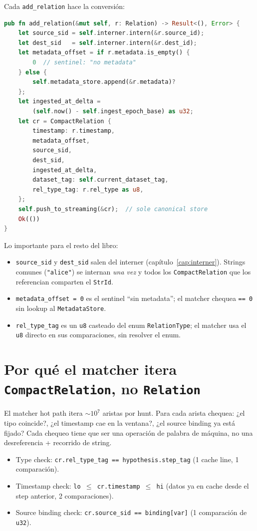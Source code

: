 Cada \texttt{add\_relation} hace la conversión:

\begin{lstlisting}[language=Rust]
pub fn add_relation(&mut self, r: Relation) -> Result<(), Error> {
    let source_sid = self.interner.intern(&r.source_id);
    let dest_sid   = self.interner.intern(&r.dest_id);
    let metadata_offset = if r.metadata.is_empty() {
        0  // sentinel: "no metadata"
    } else {
        self.metadata_store.append(&r.metadata)?
    };
    let ingested_at_delta =
        (self.now() - self.ingest_epoch_base) as u32;
    let cr = CompactRelation {
        timestamp: r.timestamp,
        metadata_offset,
        source_sid,
        dest_sid,
        ingested_at_delta,
        dataset_tag: self.current_dataset_tag,
        rel_type_tag: r.rel_type as u8,
    };
    self.push_to_streaming(&cr);  // sole canonical store
    Ok(())
}
\end{lstlisting}

\noindent
Lo importante para el resto del libro:

\begin{itemize}
    \item \texttt{source\_sid} y \texttt{dest\_sid} salen del
    interner (capítulo~\ref{cap:interner}). Strings comunes
    (\texttt{"alice"}) se internan \emph{una vez} y todos los
    \texttt{CompactRelation} que los referencian comparten el
    \texttt{StrId}.
    \item \texttt{metadata\_offset = 0} es el sentinel
    ``sin metadata''; el matcher chequea \texttt{== 0} sin lookup
    al \texttt{MetadataStore}.
    \item \texttt{rel\_type\_tag} es un \texttt{u8} casteado del enum
    \texttt{RelationType}; el matcher usa el \texttt{u8} directo en
    sus comparaciones, sin resolver el enum.
\end{itemize}

\section{Por qué el matcher itera \texttt{CompactRelation}, no \texttt{Relation}}

El matcher hot path itera $\sim 10^7$ aristas por hunt. Para cada
arista chequea: ¿el tipo coincide?, ¿el timestamp cae en la ventana?,
¿el source binding ya está fijado? Cada chequeo tiene que ser una
operación de palabra de máquina, no una desreferencia + recorrido
de string.

\begin{itemize}
    \item Type check: \texttt{cr.rel\_type\_tag == hypothesis.step\_tag}
    (1 cache line, 1 comparación).
    \item Timestamp check: \texttt{lo $\leq$ cr.timestamp $\leq$ hi}
    (datos ya en cache desde el step anterior, 2 comparaciones).
    \item Source binding check: \texttt{cr.source\_sid ==
    binding[var]} (1 comparación de \texttt{u32}).
\end{itemize}

